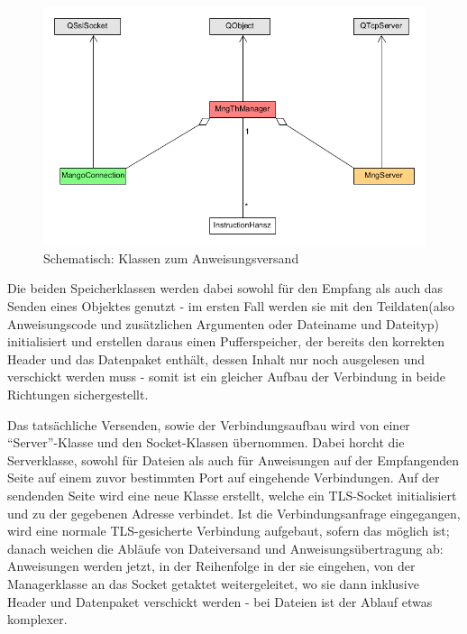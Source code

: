 \begin{figure}
\includegraphics[scale=.4]{classDiagInstr}
\caption{Schematisch: Klassen zum Anweisungsversand}
\label{inst_d}
\end{figure}

Die beiden Speicherklassen werden dabei sowohl für den Empfang als auch das Senden eines Objektes genutzt - im ersten Fall werden sie mit den Teildaten(also Anweisungscode und zusätzlichen Argumenten oder Dateiname und Dateityp) initialisiert und erstellen daraus einen Pufferspeicher, der bereits den korrekten Header und das Datenpaket enthält, dessen Inhalt nur noch ausgelesen und verschickt werden muss - somit ist ein gleicher Aufbau der Verbindung in beide Richtungen sichergestellt.\par
Das tatsächliche Versenden, sowie der Verbindungsaufbau wird von einer "`Server"'-Klasse und den Socket-Klassen übernommen.
Dabei horcht die Serverklasse, sowohl für Dateien als auch für Anweisungen auf der Empfangenden Seite auf einem zuvor bestimmten Port auf eingehende Verbindungen.
Auf der sendenden Seite wird eine neue Klasse erstellt, welche ein TLS-Socket initialisiert und zu der gegebenen Adresse verbindet.
Ist die Verbindungsanfrage eingegangen, wird eine normale TLS-gesicherte Verbindung aufgebaut, sofern das möglich ist; danach weichen die Abläufe von Dateiversand und Anweisungsübertragung ab: Anweisungen werden jetzt, in der Reihenfolge in der sie eingehen, von der Managerklasse an das Socket getaktet weitergeleitet, wo sie dann inklusive Header und Datenpaket verschickt werden - bei Dateien ist der Ablauf etwas komplexer.\par

